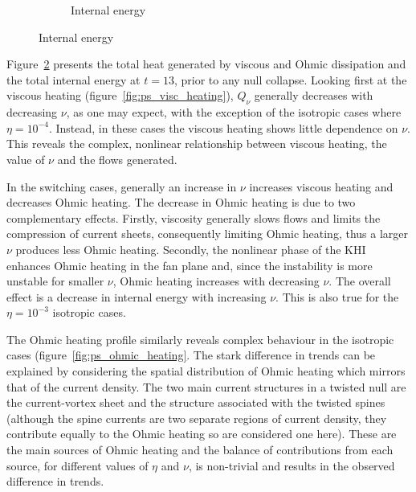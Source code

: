 \begin{figure}[t]
\begin{subfigure}{0.32\textwidth}
      \caption{Internal energy}%
      \label{fig:ps_interal_energy}
    \end{subfigure}
  \label{fig:ps_heating}
\end{figure}

Figure~\ref{fig:ps_heating} presents the total heat generated by viscous and Ohmic dissipation and the total internal energy at $t=13$, prior to any null collapse. Looking first at the viscous heating (figure~\ref{fig:ps_visc_heating}), $Q_{\nu}$ generally decreases with decreasing $\nu$, as one may expect, with the exception of the isotropic cases where $\eta=10^{-4}$. Instead, in these cases the viscous heating shows little dependence on $\nu$. This reveals the complex, nonlinear relationship between viscous heating, the value of $\nu$ and the flows generated.

In the switching cases, generally an increase in $\nu$ increases viscous heating and decreases Ohmic heating. The decrease in Ohmic heating is due to two complementary effects. Firstly, viscosity generally slows flows and limits the compression of current sheets, consequently limiting Ohmic heating, thus a larger $\nu$ produces less Ohmic heating. Secondly, the nonlinear phase of the KHI enhances Ohmic heating in the fan plane and, since the instability is more unstable for smaller $\nu$, Ohmic heating increases with decreasing $\nu$. The overall effect is a decrease in internal energy with increasing $\nu$. This is also true for the $\eta=10^{-3}$ isotropic cases.

The Ohmic heating profile similarly reveals complex behaviour in the isotropic cases (figure~\ref{fig:ps_ohmic_heating}. The stark difference in trends can be explained by considering the spatial distribution of Ohmic heating which mirrors that of the current density. The two main current structures in a twisted null are the current-vortex sheet and the structure associated with the twisted spines (although the spine currents are two separate regions of current density, they contribute equally to the Ohmic heating so are considered one here). These are the main sources of Ohmic heating and the balance of contributions from each source, for different values of $\eta$ and $\nu$, is non-trivial and results in the observed difference in trends.


